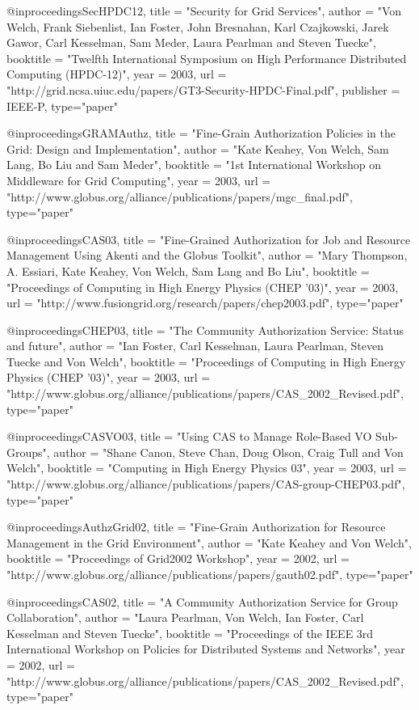 @inproceedings{SecHPDC12,
title	= "Security for Grid Services",
author  = "Von Welch, Frank Siebenlist, Ian Foster, John Bresnahan, Karl Czajkowski, Jarek Gawor, Carl Kesselman, Sam Meder, Laura Pearlman and Steven Tuecke",
booktitle = "Twelfth International Symposium on High Performance Distributed Computing (HPDC-12)",
year = {2003},
url = "http://grid.ncsa.uiuc.edu/papers/GT3-Security-HPDC-Final.pdf",
publisher = IEEE-P,
type="paper"
}

@inproceedings{GRAMAuthz,
title	= "Fine-Grain Authorization Policies in the {G}rid: Design and Implementation",
author  = "Kate Keahey, Von Welch, Sam Lang, Bo Liu and Sam Meder",
booktitle = "1st International Workshop on Middleware for Grid Computing",
year = {2003},
url = "http://www.globus.org/alliance/publications/papers/mgc_final.pdf",
type="paper"
}

@inproceedings{CAS03,
title	= "{F}ine-Grained {A}uthorization for {J}ob and {R}esource {M}anagement Using {A}kenti and the {G}lobus {T}oolkit",
author  = "Mary Thompson, A. Essiari, Kate Keahey, Von Welch, Sam Lang and Bo Liu",
booktitle = "Proceedings of Computing in High Energy Physics (CHEP '03)",
year = {2003},
url = "http://www.fusiongrid.org/research/papers/chep2003.pdf",
type="paper"
}

@inproceedings{CHEP03,
title	= "The {C}ommunity {A}uthorization {S}ervice: Status and future",
author  = "Ian Foster, Carl Kesselman, Laura Pearlman, Steven Tuecke and Von Welch",
booktitle = "Proceedings of Computing in High Energy Physics (CHEP '03)",
year = {2003},
url = "http://www.globus.org/alliance/publications/papers/CAS_2002_Revised.pdf",
type="paper"
}

@inproceedings{CASVO03,
title	= "Using {CAS} to Manage Role-Based {VO} Sub-Groups",
author  = "Shane Canon, Steve Chan, Doug Olson, Craig Tull and Von Welch",
booktitle = "Computing in High Energy Physics 03",
year = {2003},
url = "http://www.globus.org/alliance/publications/papers/CAS-group-CHEP03.pdf",
type="paper"
}

@inproceedings{AuthzGrid02,
title	= "Fine-Grain Authorization for Resource Management in the {G}rid Environment",
author  = "Kate Keahey and Von Welch",
booktitle = "Proceedings of Grid2002 Workshop",
year = {2002},
url = "http://www.globus.org/alliance/publications/papers/gauth02.pdf",
type="paper"
}

@inproceedings{CAS02,
title	= "A {C}ommunity {A}uthorization {S}ervice for Group Collaboration",
author  = "Laura Pearlman, Von Welch, Ian Foster, Carl Kesselman and Steven Tuecke", 
booktitle = "Proceedings of the IEEE 3rd International Workshop on Policies for Distributed Systems and Networks",
year = {2002},
url = "http://www.globus.org/alliance/publications/papers/CAS_2002_Revised.pdf",
type="paper"
}


